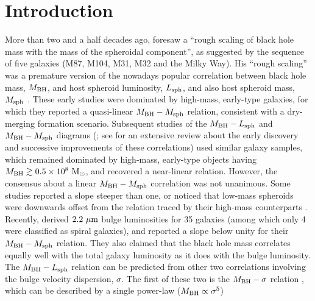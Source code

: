 \documentclass[preprint2]{emulateapj}
\begin{document}

\section{Introduction}
\label{sec:int}
More than two and a half decades ago, 
\cite{dressler1989} foresaw a ``rough scaling of black hole mass with the mass of the spheroidal component'', 
as suggested by the sequence of five galaxies (M87, M104, M31, M32 and the Milky Way). 
His ``rough scaling'' was a premature version of the nowadays popular correlation between black hole mass, $M_{\rm BH}$,  
and host spheroid luminosity, $L_{\rm sph}$, and also host spheroid mass, $M_{\rm sph}$ 
\citep{yee1992,kormendyrichstone1995,magorrian1998,marconihunt2003,haringrix2004}. 
These early studies were dominated by high-mass, early-type galaxies, 
for which they reported a quasi-linear $M_{\rm BH} - M_{\rm sph}$ relation, 
consistent with a dry-merging formation scenario. 
Subsequent studies of the $M_{\rm BH} - L_{\rm sph}$ and $M_{\rm BH} - M_{\rm sph}$ diagrams 
(\citealt{ferrareseford2005,lauer2007,graham2007,graham2008bar,gultelkin2009,sani2011,beifiori2012,erwingadotti2012,
vika2012,vandenbosch2012,mcconnellma2013,kormendyho2013,rusli2013}; 
see \citealt{graham2015bulges} for an extensive review about the early discovery and successive improvements of these correlations)
used similar galaxy samples, which remained dominated by high-mass, early-type objects having $M_{\rm BH} \gtrsim 0.5 \times 10^8~\rm M_\odot$, 
and recovered a near-linear relation. 
However, the consensus about a linear $M_{\rm BH} - M_{\rm sph}$ correlation was not unanimous. 
Some studies reported a slope steeper than one,  
or noticed that low-mass spheroids were downwards offset from the relation traced by their high-mass counterparts 
\citep{laor1998,wandel1999,laor2001,ryan2007}.
Recently, \cite{lasker2014data,lasker2014anal} derived $2.2~\rm \mu m$ bulge luminosities for 35 galaxies 
(among which only 4 were classified as spiral galaxies), 
and reported a slope below unity for their $M_{\rm BH} - M_{\rm sph}$ relation. 
They also claimed that the black hole mass correlates equally well with the total galaxy luminosity 
as it does with the bulge luminosity. \\
The $M_{\rm BH} - L_{\rm sph}$ relation can be predicted from other two correlations involving the bulge velocity dispersion, $\sigma$.
The first of these two is the $M_{\rm BH} - \sigma$ relation \citep{ferraresemerritt2000,gebhardt2000},
which can be described by a single power-law ($M_{\rm BH} \propto \sigma^5$) 
\end{document}
